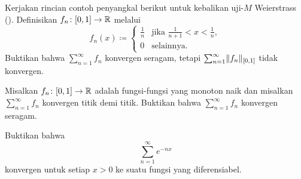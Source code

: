 \begin{exercise}
Kerjakan rincian contoh penyangkal berikut untuk kebalikan
uji-$M$ Weierstrass ().  Definisikan
$f_n \colon [0,1] \to {\mathbb{R}}$ melalui
\begin{equation*}
f_n(x) \coloneqq
\begin{cases}
\frac{1}{n} & \text{jika } \frac{1}{n+1} < x < \frac{1}{n},\\
0	    & \text{selainnya.}
\end{cases}
\end{equation*}
Buktikan bahwa $\sum_{n=1}^\infty f_n$ konvergen seragam, tetapi
$\sum_{n=1}^\infty \lVert {f_n} \rVert_{[0,1]}$
tidak konvergen.
\end{exercise}

\begin{exercise}
Misalkan $f_n \colon [0,1] \to {\mathbb{R}}$ adalah fungsi-fungsi yang monoton naik dan
misalkan $\sum_{n=1}^\infty f_n$ konvergen titik demi titik.  Buktikan bahwa
$\sum_{n=1}^\infty f_n$
konvergen seragam.
\end{exercise}

\begin{exercise}
Buktikan bahwa
\begin{equation*}
\sum_{n=1}^\infty e^{-nx}
\end{equation*}
konvergen untuk setiap $x > 0$ ke suatu fungsi yang diferensiabel.
\end{exercise}
